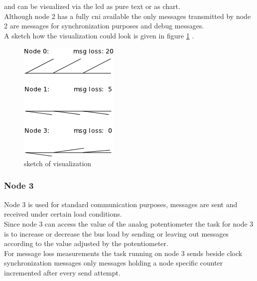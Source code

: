 and can be visualized via the lcd as pure text or as chart.\\

Although node 2 has a fully cni available the only messages transmitted by node 2 are messages for synchronization purposes and debug messages.\\

A sketch how the visualization could look is given in figure \ref{fig:app:specification:node2} .

\begin{figure}[h]
 \centering
 \includegraphics[scale=0.8]{../images/app_visu_sketch.png}
 \caption{sketch of visualization}
 \label{fig:app:specification:node2}
\end{figure}


\subsubsection{Node 3}
\label{sec:app:specification:node3}

Node 3 is used for standard communication purposes, messages are sent and received under certain load conditions.\\

Since node 3 can access the value of the analog potentiometer the task for node 3 is to increase or decrease the bus load by sending or leaving out messages according to the value adjusted by the potentiometer.\\

For message loss measurements the task running on node 3 sends beside clock synchronization messages only messages holding a node specific counter incremented after every send attempt.\\ 

